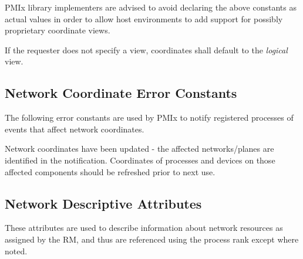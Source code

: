 \adviceimplstart
\ac{PMIx} library implementers are advised to avoid declaring the above constants as actual  values in order to allow host environments to add support for possibly proprietary coordinate views.
\adviceimplend

If the requester does not specify a view, coordinates shall default to the \emph{logical} view.


\subsection{Network Coordinate Error Constants}
\label{api:netcoord:errors}

The following error constants are used by \ac{PMIx} to notify registered processes of events that affect network coordinates.

\begin{constantdesc}

%
Network coordinates have been updated - the affected networks/planes are identified in the notification. Coordinates of processes and devices on those affected components should be refreshed prior to next use.

\end{constantdesc}


\subsection{Network Descriptive Attributes}
\label{api:struct:attributes:netinfo}

These attributes are used to describe information about network resources as assigned by the \ac{RM}, and thus are referenced using the process rank except where noted.

%

%

